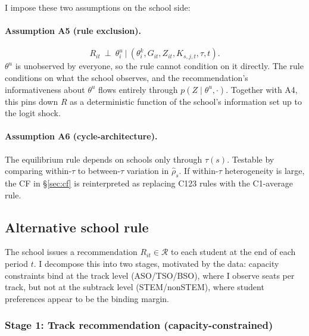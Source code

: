 \documentclass{article}
\begin{document}
I impose these two assumptions on the school side:

\paragraph{Assumption A5 (rule exclusion).}
\begin{equation}
  R_{it} \ \perp\ \theta^u_i \ \big|\ (\theta^k_i, G_{it}, Z_{it}, K_{s,j,t}, \tau, t).
  \label{eq:A5}
\end{equation}
$\theta^u$ is unobserved by everyone, so the rule cannot condition on it directly. The rule conditions on what the school observes, and the recommendation's informativeness about $\theta^u$ flows entirely through $p(Z \mid \theta^u, \cdot)$. Together with A4, this pins down $R$ as a deterministic function of the school's information set up to the logit shock.

\paragraph{Assumption A6 (cycle-architecture).} The equilibrium rule depends on schools only through $\tau(s)$. Testable by comparing within-$\tau$ to between-$\tau$ variation in $\hat\rho_s$. If within-$\tau$ heterogeneity is large, the CF in \S\ref{sec:cf} is reinterpreted as replacing C123 rules with the C1-average rule.


\subsection{Alternative school rule}
The school issues a recommendation $R_{it} \in \mathcal{R}$ to each student at the end of each period $t$. I decompose this into two stages, motivated by the data: capacity constraints bind at the track level (ASO/TSO/BSO), where I observe seats per track, but not at the subtrack level (STEM/nonSTEM), where student preferences appear to be the binding margin.

\subsubsection{Stage 1: Track recommendation (capacity-constrained)}
\end{document}
